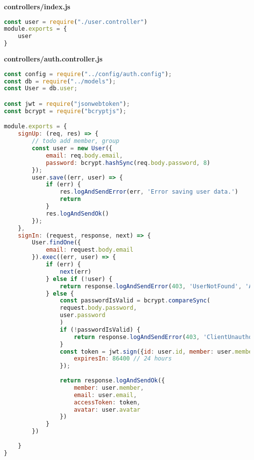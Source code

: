 \textbf{controllers/index.js}
\begin{lstlisting}[language=JavaScript]
const user = require("./user.controller")
module.exports = {
	user
}	
\end{lstlisting}

\textbf{controllers/auth.controller.js}
\begin{lstlisting}[language=JavaScript]
const config = require("../config/auth.config");
const db = require("../models");
const User = db.user;

const jwt = require("jsonwebtoken");
const bcrypt = require("bcryptjs");

module.exports = {
	signUp: (req, res) => {
		// todo add member, group
		const user = new User({
			email: req.body.email,
			password: bcrypt.hashSync(req.body.password, 8)
		});
		user.save((err, user) => {
			if (err) {
				res.logAndSendError(err, 'Error saving user data.')
				return
			}
			res.logAndSendOk()
		});
	},
	signIn: (request, response, next) => {
		User.findOne({
			email: request.body.email
		}).exec((err, user) => {
			if (err) {
				next(err)
			} else if (!user) {
				return response.logAndSendError(403, 'UserNotFound', 'A user with the email provided doesn\'t exist.')
			} else {
				const passwordIsValid = bcrypt.compareSync(
				request.body.password,
				user.password
				)
				if (!passwordIsValid) {
					return response.logAndSendError(403, 'ClientUnauthorized', 'Password provided is not valid.')
				}
				const token = jwt.sign({id: user.id, member: user.member, email: user.email, group: user.group}, config.secret, {
					expiresIn: 86400 // 24 hours
				});
				
				return response.logAndSendOk({
					member: user.member,
					email: user.email,
					accessToken: token,
					avatar: user.avatar
				})
			}
		})
		
	}
}	
\end{lstlisting}

